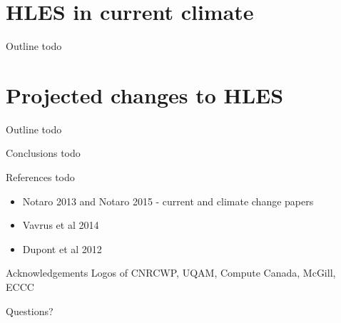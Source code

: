 \documentclass{beamer}
\begin{document}
  \section{HLES in current climate}
  \begin{frame}{Outline}
    todo
  \end{frame}


  \section{Projected changes to HLES}
  \begin{frame}{Outline}
    todo
  \end{frame}


  \begin{frame}{Conclusions}
    todo
  \end{frame}



  \begin{frame}{References}
    todo
    \begin{itemize}
      \item Notaro 2013 and Notaro 2015 - current and climate change papers
      \item Vavrus et al 2014
      \item Dupont et al 2012
    \end{itemize}
  \end{frame}



  \begin{frame}{Acknowledgements}
      Logos of CNRCWP, UQAM, Compute Canada, McGill, ECCC
  \end{frame}


  \begin{frame}[standout]
    Questions?
  \end{frame}

\appendix
\end{document}
